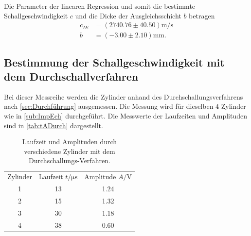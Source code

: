 Die Parameter der linearen Regression und somit die bestimmte Schallgeschwindigkeit $c$ und die Dicke der Ausgleichsschicht $b$ betragen
\begin{align*}
  c_{IE}& =( 2740.76\pm 40.50 ) \si{\meter\per\second}\\
  b &= (-3.00\pm 2.10) \si{\milli\meter}.
\end{align*}


\subsection{Bestimmung der Schallgeschwindigkeit mit dem Durchschallverfahren}
\label{subsec:SchallDurchV}

Bei dieser Messreihe werden die Zylinder anhand des Durchschallungsverfahrens nach \autoref{sec:Durchführung} ausgemessen.
Die Messung wird für dieselben $4$ Zylinder wie in \autoref{sub:ImpEch} durchgeführt.
Die Messwerte der Laufzeiten und Amplituden sind in \autoref{tab:tADurch} dargestellt.

\begin{table}[H]
  \centering
  \caption{Laufzeit und Amplituden durch verschiedene Zylinder mit dem Durchschallungs-Verfahren.}
  \label{tab:tADurch}
  \begin{tabular}{S[table-format=1.0] S[table-format=2.0] S[table-format=1.2] }
  \toprule
  {Zylinder} & {Laufzeit $t / \si{\micro\second}$} &  {Amplitude $A / \si{\volt}$}\\
  1 &  13  & 1.24  \\
  2 &  15  & 1.32  \\
  3 &  30  & 1.18  \\
  4 &  38  & 0.60  \\
  \bottomrule
  \end{tabular}
\end{table}

